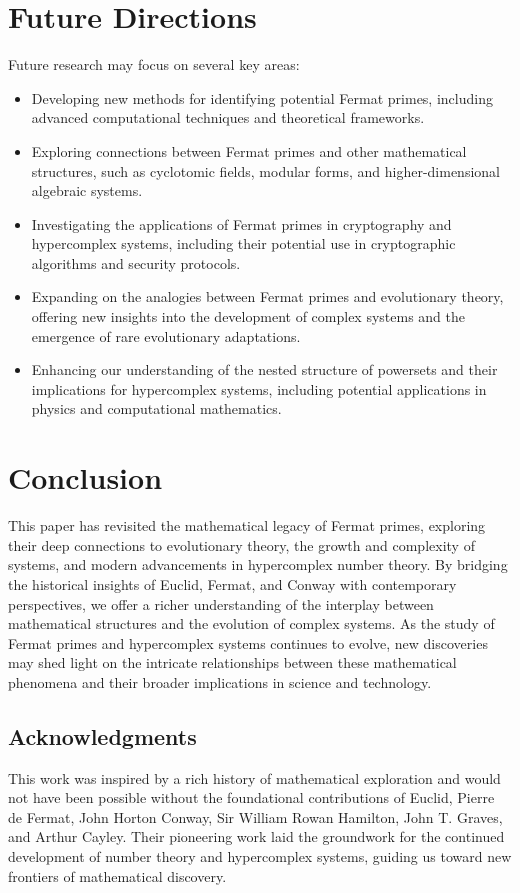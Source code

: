 \documentclass[12pt]{article}
\begin{document}
\section{Future Directions}

Future research may focus on several key areas:

\begin{itemize}
    \item Developing new methods for identifying potential Fermat primes, including advanced computational techniques and theoretical frameworks.
    \item Exploring connections between Fermat primes and other mathematical structures, such as cyclotomic fields, modular forms, and higher-dimensional algebraic systems.
    \item Investigating the applications of Fermat primes in cryptography and hypercomplex systems, including their potential use in cryptographic algorithms and security protocols.
    \item Expanding on the analogies between Fermat primes and evolutionary theory, offering new insights into the development of complex systems and the emergence of rare evolutionary adaptations.
    \item Enhancing our understanding of the nested structure of powersets and their implications for hypercomplex systems, including potential applications in physics and computational mathematics.
\end{itemize}

\section{Conclusion}

This paper has revisited the mathematical legacy of Fermat primes, exploring their deep connections to evolutionary theory, the growth and complexity of systems, and modern advancements in hypercomplex number theory. By bridging the historical insights of Euclid, Fermat, and Conway with contemporary perspectives, we offer a richer understanding of the interplay between mathematical structures and the evolution of complex systems. As the study of Fermat primes and hypercomplex systems continues to evolve, new discoveries may shed light on the intricate relationships between these mathematical phenomena and their broader implications in science and technology.

\subsection*{Acknowledgments}
This work was inspired by a rich history of mathematical exploration and would not have been possible without the foundational contributions of Euclid, Pierre de Fermat, John Horton Conway, Sir William Rowan Hamilton, John T. Graves, and Arthur Cayley. Their pioneering work laid the groundwork for the continued development of number theory and hypercomplex systems, guiding us toward new frontiers of mathematical discovery.
\end{document}

